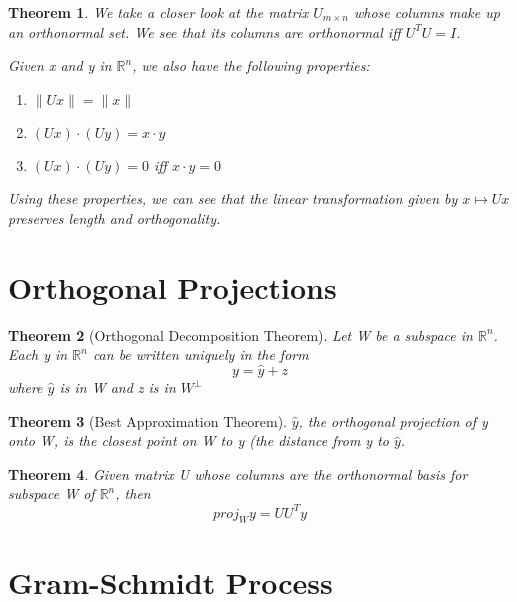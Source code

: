\documentclass[12pt]{report}
\newtheorem{thm}{Theorem}
\newcommand{\mtx}[3]{$#1_{#2\times #3}$}
\begin{document}
\begin{thm}
We take a closer look at the matrix \mtx{U}{m}{n} whose columns make up an orthonormal set. We see that its columns are orthonormal iff $U^TU=I$.

Given x and y in $\mathbb{R}^n$, we also have the following properties:
\begin{enumerate}
\item $\|Ux\| = \|x\|$
\item $(Ux)\cdot (Uy)=x\cdot y$
\item $(Ux)\cdot (Uy)=0$ iff $x\cdot y=0$
\end{enumerate}

Using these properties, we can see that the linear transformation given by $x\mapsto Ux$ preserves length and orthogonality.

\end{thm}

\section{Orthogonal Projections}

\begin{thm}[Orthogonal Decomposition Theorem]
Let W be a subspace in $\mathbb{R}^n$. Each y in $\mathbb{R}^n$ can be written uniquely in the form
\begin{equation}
y = \hat{y} + z
\end{equation}
where $\hat{y}$ is in W and z is in $W^\perp$
\end{thm}

\begin{thm}[Best Approximation Theorem]
$\hat{y}$, the orthogonal projection of y onto W, is the closest point on W to y (the distance from y to $\hat{y}$.
\end{thm}

\begin{thm}
Given matrix U whose columns are the orthonormal basis for subspace W of $\mathbb{R}^n$, then
\begin{equation}
proj_W y = UU^Ty
\end{equation}
\end{thm}

\section{Gram-Schmidt Process}
\end{document}
